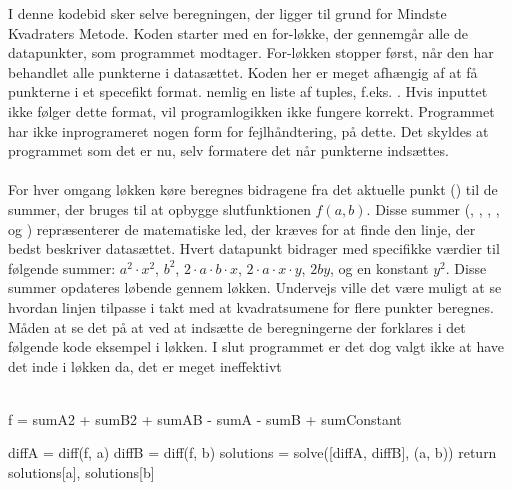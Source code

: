 I denne kodebid sker selve beregningen, der ligger til grund for Mindste Kvadraters Metode. Koden starter med en for-løkke, der gennemgår alle de datapunkter, som programmet modtager. For-løkken stopper først, når den har behandlet alle punkterne i datasættet. Koden her er meget afhængig af at få punkterne i et specefikt format. nemlig en liste af tuples, f.eks. \pythoninline{[(x_1, y_1), (x_2, y_2)]}. Hvis inputtet ikke følger dette format, vil programlogikken ikke fungere korrekt. Programmet har ikke inprogrameret nogen form for fejlhåndtering, på dette. Det skyldes at programmet som det er nu, selv formatere det når punkterne indsættes. \\\\
For hver omgang løkken køre beregnes bidragene fra det aktuelle punkt () til de summer, der bruges til at opbygge slutfunktionen $f(a,b)$. Disse summer (, , , ,  og ) repræsenterer de matematiske led, der kræves for at finde den linje, der bedst beskriver datasættet. Hvert datapunkt bidrager med specifikke værdier til følgende summer: $a^2 \cdot x^2$, $b^2$, $2 \cdot a \cdot b \cdot x$, $2 \cdot a \cdot x \cdot y$, $2by$, og en konstant $y^2$. Disse summer opdateres løbende gennem løkken. Undervejs ville det være muligt at se hvordan linjen tilpasse i takt med at kvadratsumene for flere punkter beregnes. Måden at se det på at ved at indsætte de beregningerne der forklares i det følgende kode eksempel i løkken. I slut programmet er det dog valgt ikke at have det inde i løkken da, det er meget ineffektivt   \\\\
\begin{python}
    f = sumA2 + sumB2 + sumAB - sumA - sumB + sumConstant 

    diffA = diff(f, a) 
    diffB = diff(f, b) 
    solutions = solve([diffA, diffB], (a, b)) 
    return solutions[a], solutions[b] 
\end{python}
